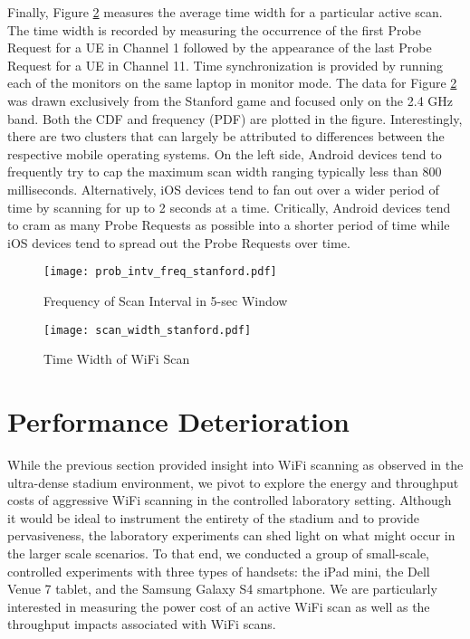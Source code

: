\documentclass[conference]{IEEEtran}
\begin{document}
Finally, Figure \ref{Graph:TimeSpan} measures the average time width for a particular active scan.  The time width is recorded by measuring the occurrence of the first Probe Request for a UE in Channel 1 followed by the appearance of the last Probe Request for a UE in Channel 11.  Time synchronization is provided by running each of the monitors on the same laptop in monitor mode.  The data for Figure \ref{Graph:TimeSpan} was drawn exclusively from the Stanford game and focused only on the 2.4 GHz band.  Both the CDF and frequency (PDF) are plotted in the figure.  Interestingly, there are two clusters that can largely be attributed to differences between the respective mobile operating systems.  On the left side, Android devices tend to frequently try to cap the maximum scan width ranging typically less than 800 milliseconds.  Alternatively, iOS devices tend to fan out over a wider period of time by scanning for up to 2 seconds at a time.  Critically, Android devices tend to cram as many Probe Requests as possible into a shorter period of time while iOS devices tend to spread out the Probe Requests over time.    

\begin{figure}
\centering
\texttt{[image: prob\_intv\_freq\_stanford.pdf]}
\caption{Frequency of Scan Interval in 5-sec Window}
\label{Graph:ScanPDFStanford}
\end{figure}


\begin{figure}

\centering

\texttt{[image: scan\_width\_stanford.pdf]}

\caption{Time Width of WiFi Scan}

\label{Graph:TimeSpan}

\end{figure}


\section{Performance Deterioration}

While the previous section provided insight into WiFi scanning as observed in the ultra-dense stadium environment, we pivot to explore the energy and throughput costs of aggressive WiFi scanning in the controlled laboratory setting. Although it would be ideal to instrument the entirety of the stadium and to provide pervasiveness, the laboratory experiments can shed light on what might occur in the larger scale scenarios. To that end, we conducted a group of small-scale, controlled experiments with three types of handsets: the iPad mini, the Dell Venue 7 tablet, and the Samsung Galaxy S4 smartphone. We are particularly interested in measuring the power cost of an active WiFi scan as well as the throughput impacts associated with WiFi scans. 
\end{document}
